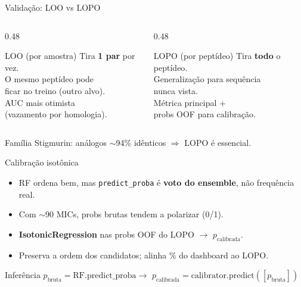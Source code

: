 \documentclass[aspectratio=169,10pt]{beamer}
\begin{document}
\begin{frame}{Validação: LOO vs LOPO}
\begin{columns}[T]
\begin{column}{0.48\textwidth}
\begin{block}{LOO (por amostra)}
Tira \textbf{1 par} por vez.\\[0.15cm]
O mesmo peptídeo pode\\
ficar no treino (outro alvo).\\[0.15cm]
{\scriptsize AUC mais otimista\\
(vazamento por homologia).}
\end{block}
\end{column}
\begin{column}{0.48\textwidth}
\begin{block}{LOPO (por peptídeo)}
Tira \textbf{todo} o peptídeo.\\[0.15cm]
Generalização para sequência\\
nunca vista.\\[0.15cm]
{\scriptsize Métrica principal +\\
probs OOF para calibração.}
\end{block}
\end{column}
\end{columns}
\vspace{0.35cm}
\begin{center}
{\small Família Stigmurin: análogos $\sim$94\% idênticos $\Rightarrow$ LOPO é essencial.}
\end{center}
\end{frame}

\begin{frame}{Calibração isotônica}
\begin{itemize}
  \item RF ordena bem, mas \texttt{predict\_proba} é \textbf{voto do ensemble}, não frequência real.
  \item Com $\sim$90 MICs, probs brutas tendem a polarizar (0/1).
  \item \textbf{IsotonicRegression} nas probs OOF do LOPO $\rightarrow$ $p_{\text{calibrada}}$.
  \item Preserva a ordem dos candidatos; alinha \% do dashboard ao LOPO.
\end{itemize}
\vspace{0.3cm}
\begin{block}{Inferência}
$p_{\text{bruta}} = \mathrm{RF.predict\_proba}$\quad$\rightarrow$\quad
$p_{\text{calibrada}} = \mathrm{calibrator.predict}([p_{\text{bruta}}])$
\end{block}
\end{frame}
\end{document}
